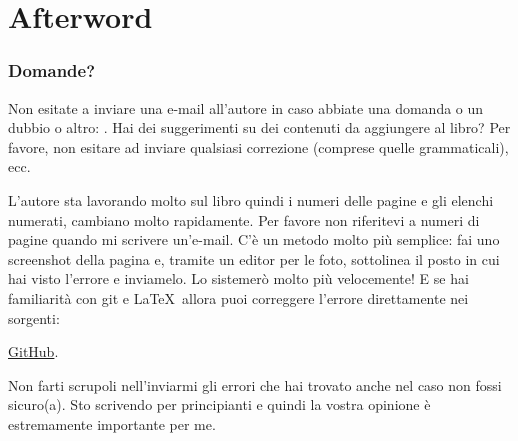 \part*{Afterword}

\section{Domande?}

Non esitate a inviare una e-mail all'autore in caso abbiate una domanda o un dubbio o altro: \GTT{<\EMAIL>}.
Hai dei suggerimenti su dei contenuti da aggiungere al libro?
Per favore, non esitare ad inviare qualsiasi correzione (comprese quelle grammaticali), ecc.

L'autore sta lavorando molto sul libro quindi i numeri delle pagine e gli elenchi numerati, \etc cambiano molto rapidamente.
Per favore non riferitevi a numeri di pagine quando mi scrivere un'e-mail.
C'è un metodo molto più semplice: fai uno screenshot della pagina e, tramite un editor per le foto, sottolinea il posto in cui hai visto l'errore
e inviamelo. Lo sistemerò molto più velocemente!
E se hai familiarità con git e \LaTeX\, allora puoi correggere l'errore direttamente nei sorgenti:

\href{http://go.yurichev.com/17089}{GitHub}.

Non farti scrupoli nell'inviarmi gli errori che hai trovato anche nel caso non fossi sicuro(a).
Sto scrivendo per principianti e quindi la vostra opinione è estremamente importante per me.
